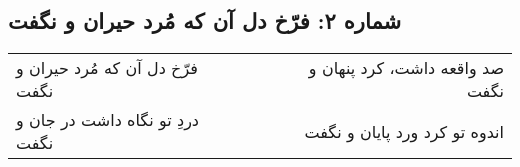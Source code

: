 \begin{center}
\section*{شماره ۲: فرّخ دل آن که مُرد حیران و نگفت}
\label{sec:002}
\begin{longtable}{l p{0.5cm} r}
فرّخ دل آن که مُرد حیران و نگفت
&&
صد واقعه داشت، کرد پنهان و نگفت
\\
دردِ تو نگاه داشت در جان و نگفت
&&
اندوه تو کرد ورد پایان و نگفت
\\
\end{longtable}
\end{center}
